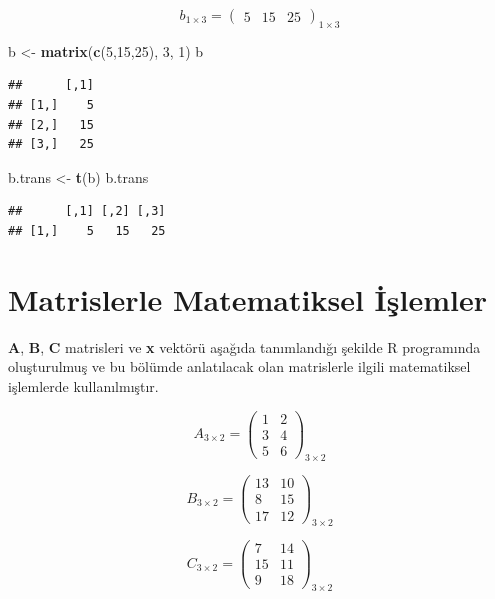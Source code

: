 \documentclass[
]{book}
\newenvironment{Shaded}{\begin{snugshade}}{\end{snugshade}}
\newcommand{\DecValTok}[1]{\textcolor[rgb]{0.00,0.00,0.81}{#1}}
\newcommand{\FunctionTok}[1]{\textcolor[rgb]{0.13,0.29,0.53}{\textbf{#1}}}
\newcommand{\NormalTok}[1]{#1}
\newcommand{\OtherTok}[1]{\textcolor[rgb]{0.56,0.35,0.01}{#1}}
\begin{document}
\[b_{1×3} =
\begin{pmatrix}
 5 & 15 & 25
\end{pmatrix}_{1×3}\]

\begin{Shaded}
\begin{Highlighting}[]
\NormalTok{ b }\OtherTok{\textless{}{-}} \FunctionTok{matrix}\NormalTok{(}\FunctionTok{c}\NormalTok{(}\DecValTok{5}\NormalTok{,}\DecValTok{15}\NormalTok{,}\DecValTok{25}\NormalTok{), }\DecValTok{3}\NormalTok{, }\DecValTok{1}\NormalTok{) }
\NormalTok{ b }
\end{Highlighting}
\end{Shaded}

\begin{verbatim}
##      [,1]
## [1,]    5
## [2,]   15
## [3,]   25
\end{verbatim}

\begin{Shaded}
\begin{Highlighting}[]
\NormalTok{ b.trans }\OtherTok{\textless{}{-}} \FunctionTok{t}\NormalTok{(b)}
\NormalTok{ b.trans}
\end{Highlighting}
\end{Shaded}

\begin{verbatim}
##      [,1] [,2] [,3]
## [1,]    5   15   25
\end{verbatim}

\section{Matrislerle Matematiksel İşlemler}\label{matrislerle-matematiksel-iux15flemler}

\textbf{A}, \textbf{B}, \textbf{C} matrisleri ve \textbf{x} vektörü aşağıda tanımlandığı şekilde R programında oluşturulmuş ve bu bölümde anlatılacak olan matrislerle ilgili matematiksel işlemlerde kullanılmıştır.

\[A_{3×2} =
\begin{pmatrix}
 1 & 2 \\
 3 & 4 \\
 5 & 6
\end{pmatrix}_{3×2}\]

\[B_{3×2} =
\begin{pmatrix}
 13 & 10 \\
 8 & 15 \\
 17 & 12
\end{pmatrix}_{3×2}\]

\[C_{3×2} =
\begin{pmatrix}
 7 & 14 \\
 15 & 11 \\
 9 & 18
\end{pmatrix}_{3×2}\]
\end{document}
